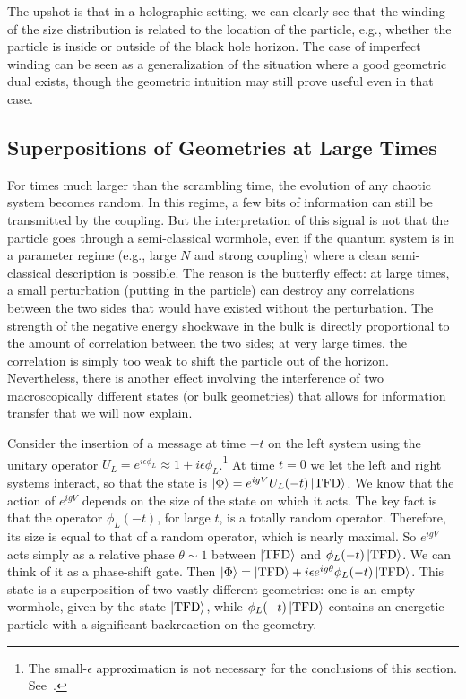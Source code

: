 \documentclass[aps,pra,reprint,floatfix,superscriptaddress, nofootinbib,longbibliography,onecolumn,notitlepage,12pt, tightenlines]{revtex4-1}
\begin{document}
The upshot is that in a holographic setting, we can clearly see that the winding of the size distribution is related to the location of the particle, e.g., whether the particle is inside or outside of the black hole horizon.
The case of imperfect winding can be seen as a generalization of the situation where a good geometric dual exists, though the geometric intuition may still prove useful even in that case.

\subsection{Superpositions of Geometries at Large Times}
For times much larger than the scrambling time, the evolution of any chaotic system becomes random. In this regime, a few bits of information can still be transmitted by the coupling. But the interpretation of this signal is not that the particle goes through a semi-classical wormhole, even if the quantum system is in a parameter regime (e.g., large $N$ and strong coupling) where a clean semi-classical description is possible. The reason is the butterfly effect: at large times, a small perturbation (putting in the particle) can destroy any correlations between the two sides that would have existed without the perturbation. 
The strength of the negative energy shockwave in the bulk is directly proportional to the amount of correlation between the two sides; at very large times, the correlation is simply too weak to shift the particle out of the horizon.
Nevertheless, there is another effect \cite{maldacena2017diving} involving the interference of two macroscopically different states (or bulk geometries) that allows for information transfer that we will now explain.

Consider the insertion of a message at time $-t$ on the left system using the unitary operator $U_L = e^{i\epsilon \phi_L} \approx 1 + i\epsilon \phi_L$.\footnote{The small-$\epsilon$ approximation is not necessary for the conclusions of this section. See~\cite{gao2018regenesis}.}  At time $t=0$ we let the left and right systems interact, so that the state is $\ket \Phi= e^{igV}U_L(-t)\ket{\mathrm{TFD}}$. We know that the action of $e^{igV}$ depends on the size of the state on which it acts. The key fact is that the operator $\phi_L(-t)$, for large $t$, is a totally random operator. Therefore, its size is equal to that of a random operator, which is nearly maximal. So $e^{igV}$ acts simply as a relative phase $\theta \sim 1$ between $\ket{\mathrm{TFD}}$ and $\phi_L(-t)\ket{\mathrm{TFD}}$. We can think of it as a phase-shift gate. Then $\ket \Phi = \ket{\mathrm{TFD}} + i\epsilon e^{ig\theta}\phi_L(-t)\ket{\mathrm{TFD}}$. This state is a superposition of two vastly different geometries: one is an empty wormhole, given by the state $\ket{\mathrm{TFD}}$, while $\phi_L(-t)\ket{\mathrm{TFD}}$ contains an energetic particle with a significant backreaction on the geometry.
\end{document}
